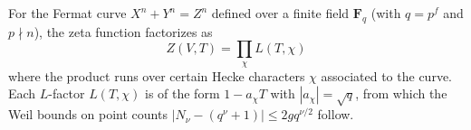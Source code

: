 For the Fermat curve $X^n + Y^n = Z^n$ defined over a finite field $\mathbf{F}_q$ (with $q = p^f$ and $p \nmid n$), the zeta function factorizes as
$$Z(V,T) = \prod_{\chi} L(T,\chi)$$
where the product runs over certain Hecke characters $\chi$ associated to the curve. Each $L$-factor $L(T,\chi)$ is of the form $1 - a_\chi T$ with $|a_\chi| = \sqrt{q}$, from which the Weil bounds on point counts $|N_\nu - (q^\nu + 1)| \leq 2g q^{\nu/2}$ follow.
